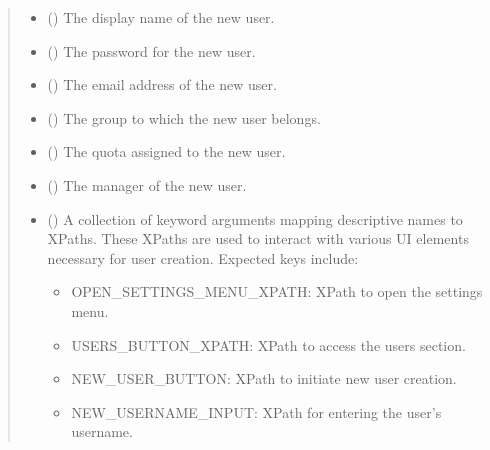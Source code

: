 \documentclass[letterpaper,10pt,english]{sphinxmanual}
\begin{document}
\begin{fulllineitems}
\begin{quote}
\begin{description}
\begin{itemize}
\item {} 
\sphinxAtStartPar
{} () \textendash{} The display name of the new user.

\item {} 
\sphinxAtStartPar
{} () \textendash{} The password for the new user.

\item {} 
\sphinxAtStartPar
{} () \textendash{} The email address of the new user.

\item {} 
\sphinxAtStartPar
{} () \textendash{} The group to which the new user belongs.

\item {} 
\sphinxAtStartPar
{} () \textendash{} The quota assigned to the new user.

\item {} 
\sphinxAtStartPar
{} () \textendash{} The manager of the new user.

\item {} 
\sphinxAtStartPar
{} () \textendash{} 
\sphinxAtStartPar
A collection of keyword arguments mapping descriptive
names to XPaths. These XPaths are used to interact with various UI elements
necessary for user creation. Expected keys include:
\begin{itemize}
\item {} 
\sphinxAtStartPar
OPEN\_SETTINGS\_MENU\_XPATH: XPath to open the settings menu.

\item {} 
\sphinxAtStartPar
USERS\_BUTTON\_XPATH: XPath to access the users section.

\item {} 
\sphinxAtStartPar
NEW\_USER\_BUTTON: XPath to initiate new user creation.

\item {} 
\sphinxAtStartPar
NEW\_USERNAME\_INPUT: XPath for entering the user’s username.


\end{itemize}
\end{itemize}
\end{description}
\end{quote}
\end{fulllineitems}
\end{document}
